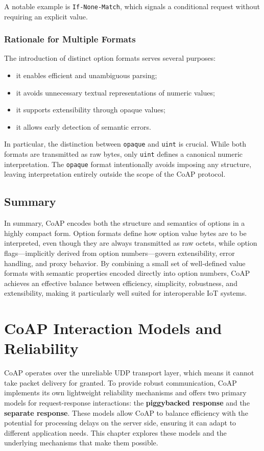 \documentclass{scrbook}
\begin{document}
A notable example is \texttt{If-None-Match}, which signals a conditional request without requiring an explicit value.

\subsection{Rationale for Multiple Formats}

The introduction of distinct option formats serves several purposes:

\begin{itemize}
    \item it enables efficient and unambiguous parsing;
    \item it avoids unnecessary textual representations of numeric values;
    \item it supports extensibility through opaque values;
    \item it allows early detection of semantic errors.
\end{itemize}

In particular, the distinction between \texttt{opaque} and \texttt{uint} is crucial. While both formats are transmitted as raw bytes, only \texttt{uint} defines a canonical numeric interpretation. The \texttt{opaque} format intentionally avoids imposing any structure, leaving interpretation entirely outside the scope of the CoAP protocol.

\section{Summary}

In summary, CoAP encodes both the structure and semantics of options in a highly compact form. Option formats define how option value bytes are to be interpreted, even though they are always transmitted as raw octets, while option flags—implicitly derived from option numbers—govern extensibility, error handling, and proxy behavior. By combining a small set of well-defined value formats with semantic properties encoded directly into option numbers, CoAP achieves an effective balance between efficiency, simplicity, robustness, and extensibility, making it particularly well suited for interoperable IoT systems.

\chapter{CoAP Interaction Models and Reliability}

CoAP operates over the unreliable UDP transport layer, which means it cannot take packet delivery for granted. To provide robust communication, CoAP implements its own lightweight reliability mechanisms and offers two primary models for request-response interactions: the \textbf{piggybacked response} and the \textbf{separate response}. These models allow CoAP to balance efficiency with the potential for processing delays on the server side, ensuring it can adapt to different application needs. This chapter explores these models and the underlying mechanisms that make them possible.
\end{document}
